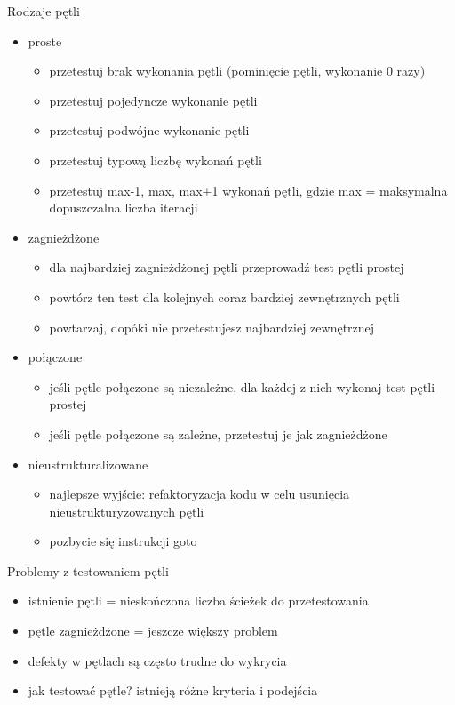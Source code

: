 \documentclass[../main.tex]{subfiles}
\begin{document}
    Rodzaje pętli
    \begin{itemize}
        \item proste
        \begin{itemize}
            \item przetestuj brak wykonania pętli (pominięcie pętli, wykonanie 0 razy)
            \item przetestuj pojedyncze wykonanie pętli
            \item przetestuj podwójne wykonanie pętli
            \item przetestuj typową liczbę wykonań pętli
            \item przetestuj max-1, max, max+1 wykonań pętli, gdzie max =
            maksymalna dopuszczalna liczba iteracji
        \end{itemize}

        \item zagnieżdżone
        \begin{itemize}
            \item dla najbardziej zagnieżdżonej pętli przeprowadź test pętli prostej
            \item powtórz ten test dla kolejnych coraz bardziej zewnętrznych pętli
            \item powtarzaj, dopóki nie przetestujesz najbardziej zewnętrznej
        \end{itemize}

        \item połączone
        \begin{itemize}
            \item jeśli pętle połączone są niezależne, dla każdej z nich wykonaj test pętli prostej
            \item jeśli pętle połączone są zależne, przetestuj je jak zagnieżdżone
        \end{itemize}

        \item nieustrukturalizowane
        \begin{itemize}
            \item najlepsze wyjście: refaktoryzacja
            kodu w celu usunięcia
            nieustrukturyzowanych pętli
            \item pozbycie się instrukcji goto
        \end{itemize}
    \end{itemize}

    Problemy z testowaniem pętli
    \begin{itemize}
        \item istnienie pętli = nieskończona liczba ścieżek do przetestowania
        \item pętle zagnieżdżone = jeszcze większy problem
        \item defekty w pętlach są często trudne do wykrycia
        \item jak testować pętle? istnieją różne kryteria i podejścia
    \end{itemize}
\end{document}
